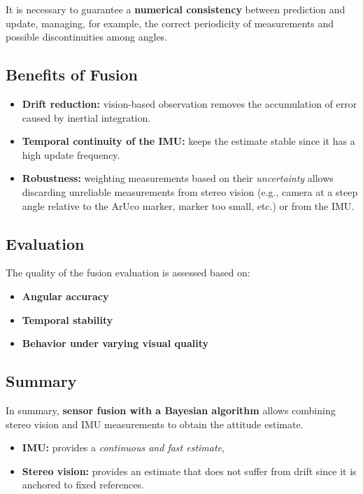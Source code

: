 It is necessary to guarantee a \textbf{numerical consistency} between prediction and update, managing, for example, the correct periodicity of measurements and possible discontinuities among angles.  

\subsection*{Benefits of Fusion}
\begin{itemize}
    \item \textbf{Drift reduction:} vision-based observation removes the accumulation of error caused by inertial integration.  
    \item \textbf{Temporal continuity of the IMU:} keeps the estimate stable since it has a high update frequency.  
    \item \textbf{Robustness:} weighting measurements based on their \textit{uncertainty} allows discarding unreliable measurements from stereo vision (e.g., camera at a steep angle relative to the ArUco marker, marker too small, etc.) or from the IMU.  
\end{itemize}

\subsection*{Evaluation}
The quality of the fusion evaluation is assessed based on:  
\begin{itemize}
    \item \textbf{Angular accuracy}  
    \item \textbf{Temporal stability}  
    \item \textbf{Behavior under varying visual quality}  
\end{itemize}

\subsection*{Summary}
In summary, \textbf{sensor fusion with a Bayesian algorithm} allows combining stereo vision and IMU measurements to obtain the attitude estimate.  
\begin{itemize}
    \item \textbf{IMU:} provides a \textit{continuous and fast estimate},  
    \item \textbf{Stereo vision:} provides an estimate that does not suffer from drift since it is anchored to fixed references.  
\end{itemize}

